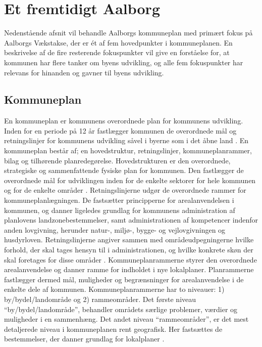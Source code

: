 \chapter{Et fremtidigt Aalborg}
Nedenstående afsnit vil behandle Aalborgs kommuneplan med primært fokus på Aalborgs Vækstakse, der er ét af fem hovedpunkter i kommuneplanen. En beskrivelse af de fire resterende fokuspunkter vil give en forståelse for, at kommunen har flere tanker om byens udvikling, og alle fem fokuspunkter har relevans for hinanden og gavner til byens udvikling.

\section{Kommuneplan}
En kommuneplan er kommunens overordnede plan for kommunens udvikling. Inden for en periode på 12 år fastlægger kommunen de overordnede mål og retningslinjer for kommunens udvikling såvel i byerne som i det åbne land \citep{kommuneplan1}. 
\newline
\newline
En kommuneplan består af; en hovedstruktur, retningslinjer, kommuneplanrammer, bilag og tilhørende planredegørelse. 
\newline \indent{     }  Hovedstrukturen er den overordnede, strategiske og sammenfattende fysiske plan for kommunen. Den fastlægger de overordnede mål for udviklingen inden for de enkelte sektorer for hele kommunen og for de enkelte områder \citep{kommuneplan1}.
\newline \indent{     }  Retningslinjerne udgør de overordnede rammer for kommuneplanlægningen. De fastsætter principperne for arealanvendelsen i kommunen, og danner ligeledes grundlag for kommunens administration af planlovens landzonebestemmelser, samt administrationen af kompetencer indenfor anden lovgivning, herunder natur-, miljø-, bygge- og vejlovgivningen og husdyrloven. Retningslinjerne angiver sammen med områdeudpegningerne hvilke forhold, der skal tages hensyn til i administrationen, og hvilke konkrete skøn der skal foretages for disse områder \citep{retningslinjer}. 
\newline \indent{     }  Kommuneplanrammerne styrer den overordnede arealanvendelse og danner ramme for indholdet i nye lokalplaner. Planrammerne fastlægger dermed mål, muligheder og begrænsninger for arealanvendelse i de enkelte dele af kommunen. Kommuneplanrammerne har to niveauer: 1) by/bydel/landområde og 2) rammeområder. Det første niveau “by/bydel/landområde”, behandler områdets særlige problemer, værdier og muligheder i en sammenhæng. Det andet niveau “rammeområder”, er det mest detaljerede niveau i kommuneplanen rent geografisk. Her fastsættes de bestemmelser, der danner grundlag for lokalplaner \citep{rammer}. 
